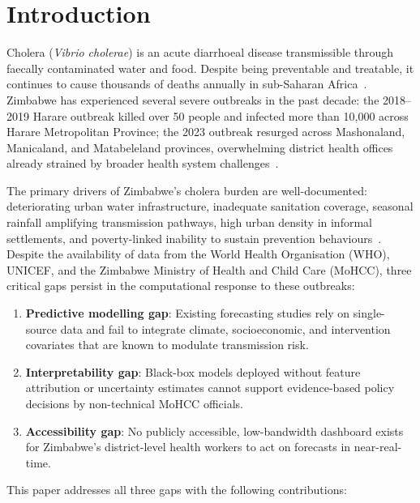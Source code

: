 \documentclass[conference]{IEEEtran}
\begin{document}
\section{Introduction}

Cholera (\textit{Vibrio cholerae}) is an acute diarrhoeal disease transmissible
through faecally contaminated water and food. Despite being preventable and
treatable, it continues to cause thousands of deaths annually in sub-Saharan
Africa~\cite{who2023cholera}. Zimbabwe has experienced several severe outbreaks
in the past decade: the 2018--2019 Harare outbreak killed over 50 people and
infected more than 10,000 across Harare Metropolitan Province; the 2023
outbreak resurged across Mashonaland, Manicaland, and Matabeleland provinces,
overwhelming district health offices already strained by broader health system
challenges~\cite{zinatha2023report}.

The primary drivers of Zimbabwe's cholera burden are well-documented:
deteriorating urban water infrastructure, inadequate sanitation coverage,
seasonal rainfall amplifying transmission pathways, high urban density in
informal settlements, and poverty-linked inability to sustain prevention
behaviours~\cite{world_bank_wash_2022}. Despite the availability of data from
the World Health Organisation (WHO), UNICEF, and the Zimbabwe Ministry of Health
and Child Care (MoHCC), three critical gaps persist in the computational
response to these outbreaks:

\begin{enumerate}
    \item \textbf{Predictive modelling gap}: Existing forecasting studies rely on
    single-source data and fail to integrate climate, socioeconomic, and
    intervention covariates that are known to modulate transmission risk.
    \item \textbf{Interpretability gap}: Black-box models deployed without
    feature attribution or uncertainty estimates cannot support evidence-based
    policy decisions by non-technical MoHCC officials.
    \item \textbf{Accessibility gap}: No publicly accessible, low-bandwidth
    dashboard exists for Zimbabwe's district-level health workers to act on
    forecasts in near-real-time.
\end{enumerate}

This paper addresses all three gaps with the following contributions:
\end{document}
